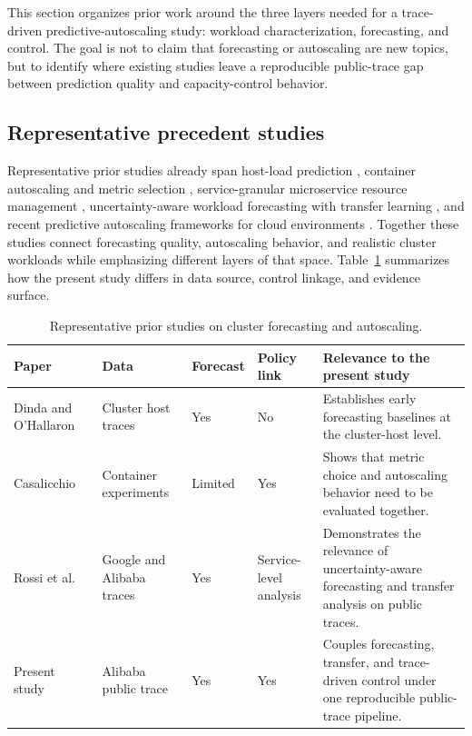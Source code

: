 \noindent This section organizes prior work around the three layers needed for a trace-driven predictive-autoscaling study: workload characterization, forecasting, and control. The goal is not to claim that forecasting or autoscaling are new topics, but to identify where existing studies leave a reproducible public-trace gap between prediction quality and capacity-control behavior.

\subsection{Representative precedent studies}

Representative prior studies already span host-load prediction \citep{Dinda2000HostLoad}, container autoscaling and metric selection \citep{Casalicchio2019ContainerAutoscaling}, service-granular microservice resource management \citep{ZargarAzad2023MicroserviceFramework,Puebla2024CdaScaler}, uncertainty-aware workload forecasting with transfer learning \citep{Rossi2025UncertaintyAwareForecasting}, and recent predictive autoscaling frameworks for cloud environments \citep{Zanussi2026LoadAwareAutoscaling}. Together these studies connect forecasting quality, autoscaling behavior, and realistic cluster workloads while emphasizing different layers of that space. Table~\ref{tab:related-positioning} summarizes how the present study differs in data source, control linkage, and evidence surface.

\begin{table}[t]
  \centering
  \caption{Representative prior studies on cluster forecasting and autoscaling.}
  \label{tab:related-positioning}
  \scriptsize
  \begin{tabular}{p{2.8cm}p{1.8cm}p{1.1cm}p{1.3cm}p{4.0cm}}
    \toprule
    Paper & Data & Forecast & Policy link & Relevance to the present study \\
    \midrule
    Dinda and O'Hallaron~\citep{Dinda2000HostLoad} & Cluster host traces & Yes & No & Establishes early forecasting baselines at the cluster-host level. \\
    Casalicchio~\citep{Casalicchio2019ContainerAutoscaling} & Container experiments & Limited & Yes & Shows that metric choice and autoscaling behavior need to be evaluated together. \\
    Rossi et al.~\citep{Rossi2025UncertaintyAwareForecasting} & Google and Alibaba traces & Yes & Service-level analysis & Demonstrates the relevance of uncertainty-aware forecasting and transfer analysis on public traces. \\
    Present study & Alibaba public trace & Yes & Yes & Couples forecasting, transfer, and trace-driven control under one reproducible public-trace pipeline. \\
    \bottomrule
  \end{tabular}
\end{table}

